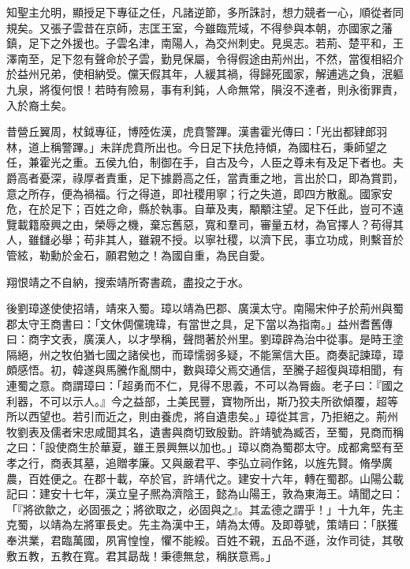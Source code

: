 \begin{pinyinscope}
知聖主允明，顯授足下專征之任，凡諸逆節，多所誅討，想力競者一心，順從者同規矣。又張子雲昔在京師，志匡王室，今雖臨荒域，不得參與本朝，亦國家之藩鎮，足下之外援也。子雲名津，南陽人，為交州刺史。見吳志。若荊、楚平和，王澤南至，足下忽有聲命於子雲，勤見保屬，令得假途由荊州出，不然，當復相紹介於益州兄弟，使相納受。儻天假其年，人緩其禍，得歸死國家，解逋逃之負，泯軀九泉，將復何恨！若時有險易，事有利鈍，人命無常，隕沒不達者，則永銜罪責，入於裔土矣。

昔營丘翼周，杖鉞專征，博陸佐漢，虎賁警蹕。漢書霍光傳曰：「光出都肄郎羽林，道上稱警蹕。」未詳虎賁所出也。今日足下扶危持傾，為國柱石，秉師望之任，兼霍光之重。五侯九伯，制御在手，自古及今，人臣之尊未有及足下者也。夫爵高者憂深，祿厚者責重，足下據爵高之任，當責重之地，言出於口，即為賞罰，意之所存，便為禍福。行之得道，即社稷用寧；行之失道，即四方散亂。國家安危，在於足下；百姓之命，縣於執事。自華及夷，顒顒注望。足下任此，豈可不遠覽載籍廢興之由，榮辱之機，棄忘舊惡，寬和羣司，審量五材，為官擇人？苟得其人，雖讎必舉；苟非其人，雖親不授。以寧社稷，以濟下民，事立功成，則繫音於管絃，勒勳於金石，願君勉之！為國自重，為民自愛。

翔恨靖之不自納，搜索靖所寄書疏，盡投之于水。

後劉璋遂使使招靖，靖來入蜀。璋以靖為巴郡、廣漢太守。南陽宋仲子於荊州與蜀郡太守王商書曰：「文休倜儻瑰瑋，有當世之具，足下當以為指南。」益州耆舊傳曰：商字文表，廣漢人，以才學稱，聲問著於州里。劉璋辟為治中從事。是時王塗隔絕，州之牧伯猶七國之諸侯也，而璋懦弱多疑，不能黨信大臣。商奏記諫璋，璋頗感悟。初，韓遂與馬騰作亂關中，數與璋父焉交通信，至騰子超復與璋相聞，有連蜀之意。商謂璋曰：「超勇而不仁，見得不思義，不可以為脣齒。老子曰：『國之利器，不可以示人。』今之益部，土美民豐，寶物所出，斯乃狡夫所欲傾覆，超等所以西望也。若引而近之，則由養虎，將自遺患矣。」璋從其言，乃拒絕之。荊州牧劉表及儒者宋忠咸聞其名，遺書與商切致殷勤。許靖號為臧否，至蜀，見商而稱之曰：「設使商生於華夏，雖王景興無以加也。」璋以商為蜀郡太守。成都禽堅有至孝之行，商表其墓，追贈孝廉。又與嚴君平、李弘立祠作銘，以旌先賢。脩學廣農，百姓便之。在郡十載，卒於官，許靖代之。建安十六年，轉在蜀郡。山陽公載記曰：建安十七年，漢立皇子熈為濟陰王，懿為山陽王，敦為東海王。靖聞之曰：「『將欲歙之，必固張之；將欲取之，必固與之』。其孟德之謂乎！」十九年，先主克蜀，以靖為左將軍長史。先主為漢中王，靖為太傅。及即尊號，策靖曰：「朕獲奉洪業，君臨萬國，夙宵惶惶，懼不能綏。百姓不親，五品不遜，汝作司徒，其敬敷五教，五教在寬。君其勗哉！秉德無怠，稱朕意焉。」


\end{pinyinscope}
